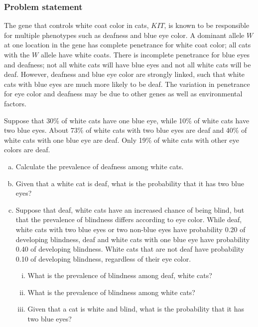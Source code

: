 \subsubsection{Problem statement}

The gene that controls white coat color in cats, $KIT$, is known to be responsible for multiple phenotypes such as deafness and blue eye color. A dominant allele $W$ at one location in the gene has complete penetrance for white coat color; all cats with the $W$ allele have white coats. There is incomplete penetrance for blue eyes and deafness; not all white cats will have blue eyes and not all white cats will be deaf. However, deafness and blue eye color are strongly linked, such that white cats with blue eyes are much more likely to be deaf. The variation in penetrance for eye color and deafness may be due to other genes as well as environmental factors.

Suppose that 30\% of white cats have one blue eye, while 10\% of white cats have two blue eyes. About 73\% of white cats with two blue eyes are deaf and 40\% of white cats with one blue eye are deaf. Only 19\% of white cats with other eye colors are deaf.

\begin{enumerate}[a)]
	\item Calculate the prevalence of deafness among white cats.
	
	\item Given that a white cat is deaf, what is the probability that it has two blue eyes?
	
	\item Suppose that deaf, white cats have an increased chance of being blind, but that the prevalence of blindness differs according to eye color. While deaf, white cats with two blue eyes or two non-blue eyes have probability 0.20 of developing blindness, deaf and white cats with one blue eye have probability 0.40 of developing blindness. White cats that are not deaf have probability 0.10 of developing blindness, regardless of their eye color.
	
	\begin{enumerate}[i.]
		\item What is the prevalence of blindness among deaf, white cats?
		
		\item What is the prevalence of blindness among white cats?
		
		\item Given that a cat is white and blind, what is the probability that it has two blue eyes?
	\end{enumerate}
\end{enumerate}

